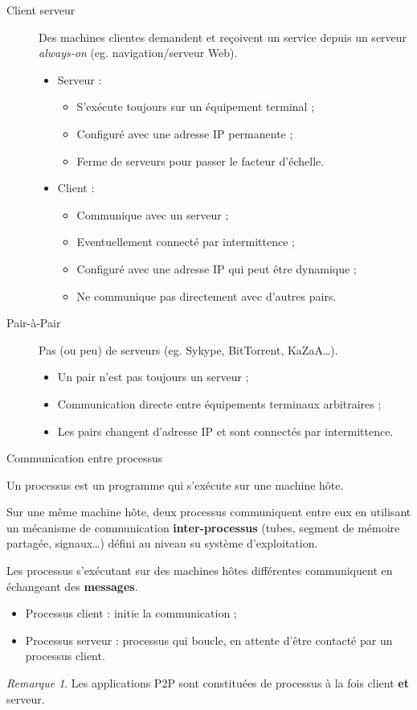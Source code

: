\documentclass[11pt,english,french]{scrreprt}
\theoremstyle{remark}
\newtheorem*{rem*}{Remarque}
\theoremstyle{definition}
\begin{document}
\begin{description}
	\item [Client serveur] Des machines clientes demandent et reçoivent un service depuis un serveur \emph{always-on} (eg. navigation/serveur Web).\begin{itemize}
		\item Serveur :\begin{itemize}
			\item S'exécute toujours sur un équipement terminal ;
			\item Configuré avec une adresse IP permanente ;
			\item Ferme de serveurs pour passer le facteur d'échelle.
		\end{itemize}
		\item Client : \begin{itemize}
			\item Communique avec un serveur ;
			\item Eventuellement connecté par intermittence ;
			\item Configuré avec une adresse IP qui peut être dynamique ;
			\item Ne communique pas directement avec d'autres pairs.
		\end{itemize}
	\end{itemize}
	\item[Pair-à-Pair] Pas (ou peu) de serveurs (eg. Sykype, BitTorrent, KaZaA\dots).\begin{itemize}
		\item Un pair n'est pas toujours un serveur ;
		\item Communication directe entre équipements terminaux arbitraires ;
		\item Les pairs changent d'adresse IP et sont connectés par intermittence.
	\end{itemize}
\end{description}

Communication entre processus

Un processus est un programme qui s'exécute sur une machine hôte. 

Sur une même machine hôte, deux processus communiquent entre eux en utilisant un mécanisme de communication \textbf{inter-processus} (tubes, segment de mémoire partagée, signaux\dots) défini au niveau su système d'exploitation.

Les processus s'exécutant sur des machines hôtes différentes communiquent en échangeant des \textbf{messages}.\begin{itemize}
	\item Processus client : initie la communication ;
	\item Processus serveur : processus qui boucle, en attente d'être contacté par un processus client.
\end{itemize}
\begin{rem*}
	Les applications P2P sont constituées de processus à la fois client \textbf{et} serveur.
\end{rem*}
\end{document}

